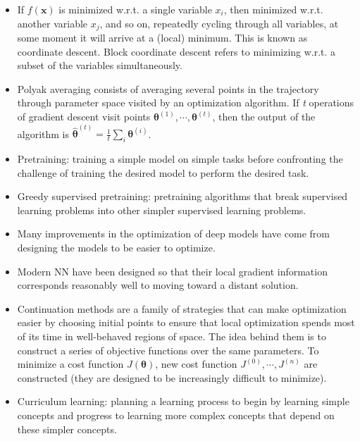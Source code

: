 \documentclass{article}
\begin{document}
\begin{itemize}
\item If \(f(\boldsymbol{x})\) is minimized w.r.t. a single variable \(x_i\), then minimized w.r.t. another variable \(x_j\), and so on, repeatedly cycling through all variables, at some moment it will arrive at a (local) minimum. This is known as coordinate descent. Block coordinate descent refers to minimizing w.r.t. a subset of the variables simultaneously.
\item Polyak averaging consists of averaging several points in the trajectory through parameter space visited by an optimization algorithm. If \textit{t} operations of gradient descent visit points \(\boldsymbol{\theta}^{(1)}, \cdots, \boldsymbol{\theta}^{(t)}\), then the output of the algorithm is \(\hat{\boldsymbol{\theta}}^{(t)} = \frac{1}{t}\sum_i \boldsymbol{\theta}^{(i)}\).
\item Pretraining: training a simple model on simple tasks before confronting the challenge of training the desired model to perform the desired task.
\item Greedy supervised pretraining: pretraining algorithms that break supervised learning problems into other simpler supervised learning problems.
\item Many improvements in the optimization of deep models have come from designing the models to be easier to optimize.
\item Modern NN have been designed so that their local gradient information corresponds reasonably well to moving toward a distant solution.
\item Continuation methods are a family of strategies that can make optimization easier by choosing initial points to ensure that local optimization spends most of its time in well-behaved regions of space. The idea behind them is to construct a series of objective functions over the same parameters. To minimize a cost function \(J(\boldsymbol{\theta})\), new cost function {\(J^{(0)}, \cdots, J^{(n)}\)} are constructed (they are designed to be increasingly difficult to minimize).
\item Curriculum learning: planning a learning process to begin by learning simple concepts and progress to learning more complex concepts that depend on these simpler concepts.
\end{itemize}
\end{document}
